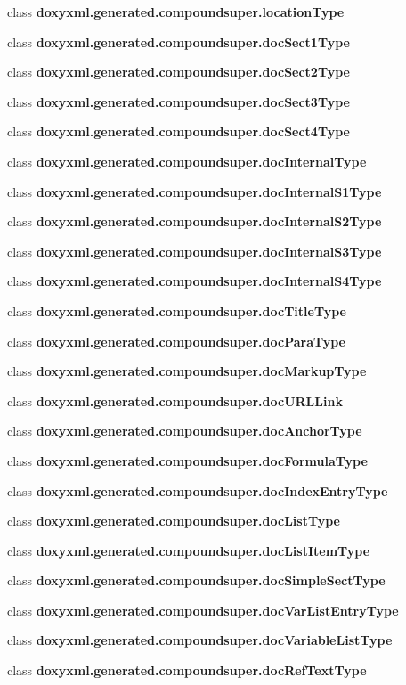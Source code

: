 \begin{DoxyCompactItemize}
class {\bf doxyxml.\+generated.\+compoundsuper.\+location\+Type}
\item 
class {\bf doxyxml.\+generated.\+compoundsuper.\+doc\+Sect1\+Type}
\item 
class {\bf doxyxml.\+generated.\+compoundsuper.\+doc\+Sect2\+Type}
\item 
class {\bf doxyxml.\+generated.\+compoundsuper.\+doc\+Sect3\+Type}
\item 
class {\bf doxyxml.\+generated.\+compoundsuper.\+doc\+Sect4\+Type}
\item 
class {\bf doxyxml.\+generated.\+compoundsuper.\+doc\+Internal\+Type}
\item 
class {\bf doxyxml.\+generated.\+compoundsuper.\+doc\+Internal\+S1\+Type}
\item 
class {\bf doxyxml.\+generated.\+compoundsuper.\+doc\+Internal\+S2\+Type}
\item 
class {\bf doxyxml.\+generated.\+compoundsuper.\+doc\+Internal\+S3\+Type}
\item 
class {\bf doxyxml.\+generated.\+compoundsuper.\+doc\+Internal\+S4\+Type}
\item 
class {\bf doxyxml.\+generated.\+compoundsuper.\+doc\+Title\+Type}
\item 
class {\bf doxyxml.\+generated.\+compoundsuper.\+doc\+Para\+Type}
\item 
class {\bf doxyxml.\+generated.\+compoundsuper.\+doc\+Markup\+Type}
\item 
class {\bf doxyxml.\+generated.\+compoundsuper.\+doc\+U\+R\+L\+Link}
\item 
class {\bf doxyxml.\+generated.\+compoundsuper.\+doc\+Anchor\+Type}
\item 
class {\bf doxyxml.\+generated.\+compoundsuper.\+doc\+Formula\+Type}
\item 
class {\bf doxyxml.\+generated.\+compoundsuper.\+doc\+Index\+Entry\+Type}
\item 
class {\bf doxyxml.\+generated.\+compoundsuper.\+doc\+List\+Type}
\item 
class {\bf doxyxml.\+generated.\+compoundsuper.\+doc\+List\+Item\+Type}
\item 
class {\bf doxyxml.\+generated.\+compoundsuper.\+doc\+Simple\+Sect\+Type}
\item 
class {\bf doxyxml.\+generated.\+compoundsuper.\+doc\+Var\+List\+Entry\+Type}
\item 
class {\bf doxyxml.\+generated.\+compoundsuper.\+doc\+Variable\+List\+Type}
\item 
class {\bf doxyxml.\+generated.\+compoundsuper.\+doc\+Ref\+Text\+Type}

\end{DoxyCompactItemize}
